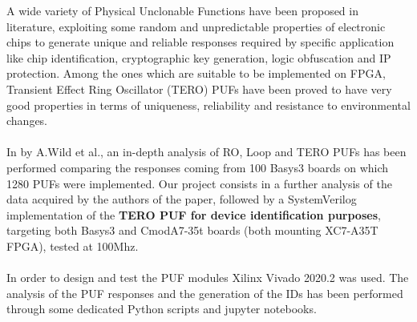 
A wide variety of Physical Unclonable Functions have been proposed in literature, exploiting
some random and unpredictable properties of electronic chips to generate unique and reliable
responses required by specific application like chip identification, cryptographic key generation, logic obfuscation
and IP protection. Among the ones which are suitable to be implemented on FPGA, Transient Effect Ring Oscillator (TERO) 
PUFs have been proved to have very good properties in terms of uniqueness, reliability and resistance to
environmental changes.\\\\
In \cite{ref_pap} by A.Wild et al., an in-depth analysis of RO, Loop and TERO PUFs has been performed comparing
the responses coming from 100 Basys3 boards on which 1280 PUFs were implemented.
Our project consists in a further analysis of the data acquired by the authors of the paper, followed by a SystemVerilog
implementation of the \textbf{TERO PUF for device identification purposes}, targeting both Basys3 and CmodA7-35t boards 
(both mounting XC7-A35T FPGA), tested at 100Mhz. \\\\
In order to design and test the PUF modules Xilinx Vivado 2020.2 was used. The analysis of the PUF responses and
the generation of the IDs has been performed through some dedicated Python scripts and jupyter notebooks.\\
